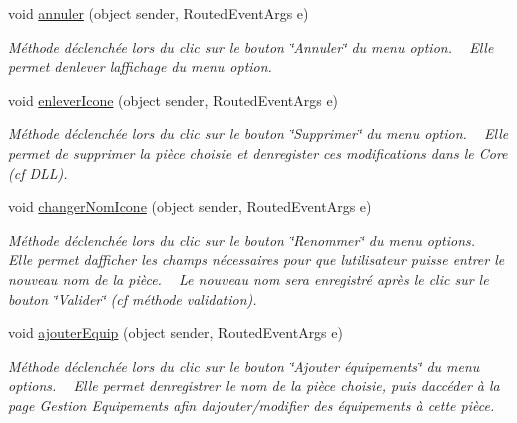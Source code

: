 \begin{DoxyCompactItemize}
void \hyperlink{class_my_domotik_1_1_gestion_pieces_af3d531ae74204ef6425071b274a476f3}{annuler} (object sender, Routed\+Event\+Args e)
\begin{DoxyCompactList}\small\item\em Méthode déclenchée lors du clic sur le bouton \char`\"{}\+Annuler\char`\"{} du menu option. ~\newline
Elle permet d\textquotesingle{}enlever l\textquotesingle{}affichage du menu option. \end{DoxyCompactList}\item 
void \hyperlink{class_my_domotik_1_1_gestion_pieces_ac07436859798da0c8373b76255a9901c}{enlever\+Icone} (object sender, Routed\+Event\+Args e)
\begin{DoxyCompactList}\small\item\em Méthode déclenchée lors du clic sur le bouton \char`\"{}\+Supprimer\char`\"{} du menu option. ~\newline
Elle permet de supprimer la pièce choisie et d\textquotesingle{}enregister ces modifications dans le Core (cf D\+LL). \end{DoxyCompactList}\item 
void \hyperlink{class_my_domotik_1_1_gestion_pieces_ab6f674ac706fb592a1beb7cf3d44b50e}{changer\+Nom\+Icone} (object sender, Routed\+Event\+Args e)
\begin{DoxyCompactList}\small\item\em Méthode déclenchée lors du clic sur le bouton \char`\"{}\+Renommer\char`\"{} du menu options. ~\newline
Elle permet d\textquotesingle{}afficher les champs nécessaires pour que l\textquotesingle{}utilisateur puisse entrer le nouveau nom de la pièce. ~\newline
Le nouveau nom sera enregistré après le clic sur le bouton \char`\"{}\+Valider\char`\"{} (cf méthode validation). \end{DoxyCompactList}\item 
void \hyperlink{class_my_domotik_1_1_gestion_pieces_a45262aa335e39a869ebe90036485f924}{ajouter\+Equip} (object sender, Routed\+Event\+Args e)
\begin{DoxyCompactList}\small\item\em Méthode déclenchée lors du clic sur le bouton \char`\"{}\+Ajouter équipements\char`\"{} du menu options. ~\newline
Elle permet d\textquotesingle{}enregistrer le nom de la pièce choisie, puis d\textquotesingle{}accéder à la page Gestion Equipements afin d\textquotesingle{}ajouter/modifier des équipements à cette pièce. \end{DoxyCompactList}\item 

\end{DoxyCompactItemize}
